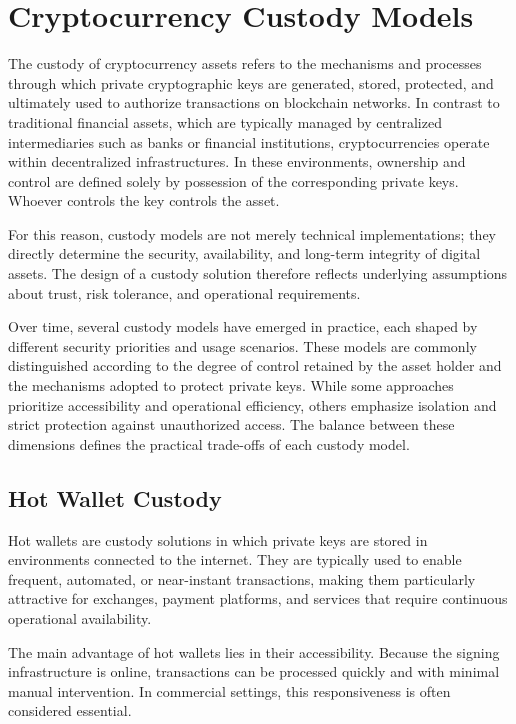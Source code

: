 \documentclass[12pt,a4paper]{report}
\begin{document}
\section{Cryptocurrency Custody Models}
The custody of cryptocurrency assets refers to the mechanisms and processes through which private cryptographic keys are generated, stored, protected, and ultimately used to authorize transactions on blockchain networks. In contrast to traditional financial assets, which are typically managed by centralized intermediaries such as banks or financial institutions, cryptocurrencies operate within decentralized infrastructures. In these environments, ownership and control are defined solely by possession of the corresponding private keys. Whoever controls the key controls the asset.\cite{FintechNews}

For this reason, custody models are not merely technical implementations; they directly determine the security, availability, and long-term integrity of digital assets. The design of a custody solution therefore reflects underlying assumptions about trust, risk tolerance, and operational requirements.

Over time, several custody models have emerged in practice, each shaped by different security priorities and usage scenarios. These models are commonly distinguished according to the degree of control retained by the asset holder and the mechanisms adopted to protect private keys. While some approaches prioritize accessibility and operational efficiency, others emphasize isolation and strict protection against unauthorized access. The balance between these dimensions defines the practical trade-offs of each custody model.

\subsection{Hot Wallet Custody}

Hot wallets are custody solutions in which private keys are stored in environments connected to the internet. They are typically used to enable frequent, automated, or near-instant transactions, making them particularly attractive for exchanges, payment platforms, and services that require continuous operational availability.

The main advantage of hot wallets lies in their accessibility. Because the signing infrastructure is online, transactions can be processed quickly and with minimal manual intervention. In commercial settings, this responsiveness is often considered essential.
\end{document}
